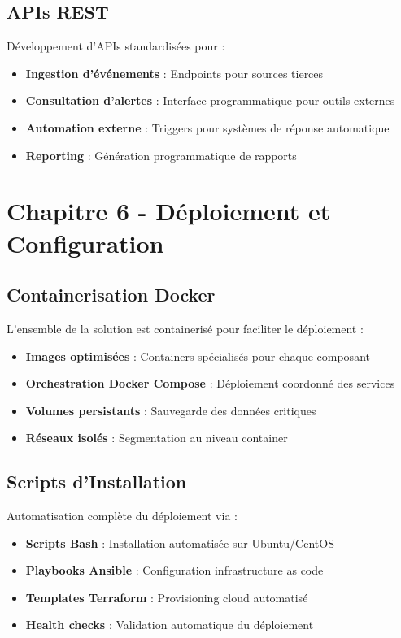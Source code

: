 \subsection{APIs REST}

Développement d'APIs standardisées pour :
\begin{itemize}
    \item \textbf{Ingestion d'événements} : Endpoints pour sources tierces
    \item \textbf{Consultation d'alertes} : Interface programmatique pour outils externes
    \item \textbf{Automation externe} : Triggers pour systèmes de réponse automatique
    \item \textbf{Reporting} : Génération programmatique de rapports
\end{itemize}

\section{Chapitre 6 - Déploiement et Configuration}

\subsection{Containerisation Docker}

L'ensemble de la solution est containerisé pour faciliter le déploiement :
\begin{itemize}
    \item \textbf{Images optimisées} : Containers spécialisés pour chaque composant
    \item \textbf{Orchestration Docker Compose} : Déploiement coordonné des services
    \item \textbf{Volumes persistants} : Sauvegarde des données critiques
    \item \textbf{Réseaux isolés} : Segmentation au niveau container
\end{itemize}

\subsection{Scripts d'Installation}

Automatisation complète du déploiement via :
\begin{itemize}
    \item \textbf{Scripts Bash} : Installation automatisée sur Ubuntu/CentOS
    \item \textbf{Playbooks Ansible} : Configuration infrastructure as code
    \item \textbf{Templates Terraform} : Provisioning cloud automatisé
    \item \textbf{Health checks} : Validation automatique du déploiement
\end{itemize}

